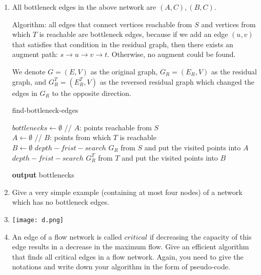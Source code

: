 \documentclass[12pt,a4paper]{article}
\makeatletter
\newtheorem*{solution}{Solution}
\theoremstyle{definition}
\renewenvironment{solution}[1][Solution] {\par\pushQED{\qed}\normalfont\topsep6\p@\@plus6\p@\relax\trivlist\item[\hskip\labelsep\bfseries#1\@addpunct{.}]\ignorespaces}{\popQED\endtrivlist\@endpefalse} \makeatother
\makeatother
\begin{document}
\begin{enumerate}
\begin{enumerate}
\begin{solution}
	All bottleneck edges in the above network are $(A,C),(B,C)$.
	
	Algorithm: all edges that connect vertices reachable from $S$ and vertices from which $T$ is reachable are bottleneck edges, because if we add an edge $(u,v)$ that satisfies that condition in the residual graph, then there exists an augment path: $s\rightarrow u\rightarrow v\rightarrow t$. Otherwise, no augment could be found.
	
	We denote $G=(E,V)$ as the original graph, $G_R=(E_R,V)$ as the residual graph, and $G_R^T=(E_R^T,V)$ as the reversed residual graph which changed the edges in $G_R$ to the opposite direction.
	
	\begin{minipage}{0.9\textwidth}
		\begin{algorithm}[H]
			\BlankLine
			\caption{find-bottleneck-edges}
			\BlankLine
			
			$bottlenecks\leftarrow\emptyset$\;
			\BlankLine
			// $A$: points reachable from $S$\\
			$A\leftarrow\emptyset$\;
			\BlankLine
			// $B$: points from which $T$ is reachable\\
			$B\leftarrow\emptyset$\;
			\BlankLine			
			$depth-frist-search$ $G_R$ from $S$ and put the visited points into $A$\;
			$depth-frist-search$ $G_R^T$ from $T$ and put the visited points into $B$\;
			\BlankLine
			
			\textbf{output} bottlenecks
		\end{algorithm}
	\end{minipage}
\end{solution}

\item
Give a very simple example (containing at most four nodes) of a network which has no bottleneck edges.
\begin{solution}\quad\par
	\begin{center}
		\texttt{[image: d.png]}
	\end{center}
\end{solution}

\item
An edge of a flow network is called $critical$ if decreasing the capacity of this edge results in a decrease in the maximum flow. Give an efficient algorithm that finds all critical edges in a flow network. Again, you need to give the notations and write down your algorithm in the form of pseudo-code.


\end{enumerate}
\end{enumerate}
\end{document}
